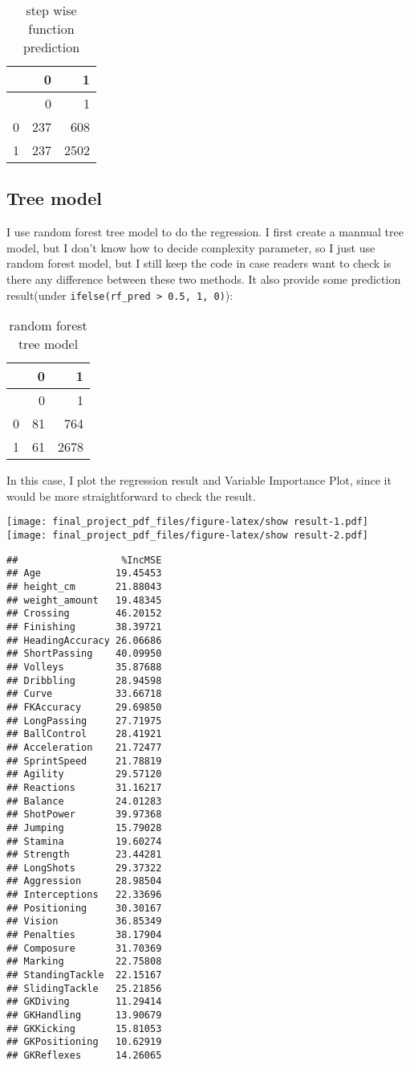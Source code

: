 \documentclass[
]{article}
\begin{document}
\begin{longtable}[]{@{}lrr@{}}
\caption{step wise function prediction}\tabularnewline
\toprule
& 0 & 1 \\
\midrule
\endfirsthead
\toprule
& 0 & 1 \\
\midrule
\endhead
0 & 237 & 608 \\
1 & 237 & 2502 \\
\bottomrule
\end{longtable}

\hypertarget{tree-model}{%
\subsection{Tree model}\label{tree-model}}

I use random forest tree model to do the regression. I first create a
mannual tree model, but I don't know how to decide complexity parameter,
so I just use random forest model, but I still keep the code in case
readers want to check is there any difference between these two methods.
It also provide some prediction result(under
\texttt{ifelse(rf\_pred\ \textgreater{}\ 0.5,\ 1,\ 0)}):

\begin{longtable}[]{@{}lrr@{}}
\caption{random forest tree model}\tabularnewline
\toprule
& 0 & 1 \\
\midrule
\endfirsthead
\toprule
& 0 & 1 \\
\midrule
\endhead
0 & 81 & 764 \\
1 & 61 & 2678 \\
\bottomrule
\end{longtable}

In this case, I plot the regression result and Variable Importance Plot,
since it would be more straightforward to check the result.

\texttt{[image: final\_project\_pdf\_files/figure-latex/show result-1.pdf]}
\texttt{[image: final\_project\_pdf\_files/figure-latex/show result-2.pdf]}

\begin{verbatim}
##                  %IncMSE
## Age             19.45453
## height_cm       21.88043
## weight_amount   19.48345
## Crossing        46.20152
## Finishing       38.39721
## HeadingAccuracy 26.06686
## ShortPassing    40.09950
## Volleys         35.87688
## Dribbling       28.94598
## Curve           33.66718
## FKAccuracy      29.69850
## LongPassing     27.71975
## BallControl     28.41921
## Acceleration    21.72477
## SprintSpeed     21.78819
## Agility         29.57120
## Reactions       31.16217
## Balance         24.01283
## ShotPower       39.97368
## Jumping         15.79028
## Stamina         19.60274
## Strength        23.44281
## LongShots       29.37322
## Aggression      28.98504
## Interceptions   22.33696
## Positioning     30.30167
## Vision          36.85349
## Penalties       38.17904
## Composure       31.70369
## Marking         22.75808
## StandingTackle  22.15167
## SlidingTackle   25.21856
## GKDiving        11.29414
## GKHandling      13.90679
## GKKicking       15.81053
## GKPositioning   10.62919
## GKReflexes      14.26065
\end{verbatim}
\end{document}
